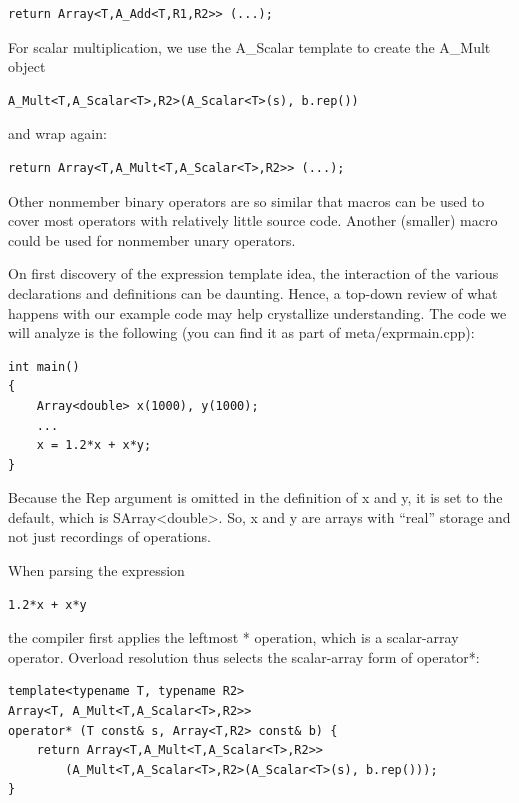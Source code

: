 \begin{lstlisting}[style=styleCXX]
return Array<T,A_Add<T,R1,R2>> (...);
\end{lstlisting}

For scalar multiplication, we use the A\_Scalar template to create the A\_Mult object

\begin{lstlisting}[style=styleCXX]
A_Mult<T,A_Scalar<T>,R2>(A_Scalar<T>(s), b.rep())
\end{lstlisting}

and wrap again:

\begin{lstlisting}[style=styleCXX]
return Array<T,A_Mult<T,A_Scalar<T>,R2>> (...);
\end{lstlisting}

Other nonmember binary operators are so similar that macros can be used to cover most operators with relatively little source code. Another (smaller) macro could be used for nonmember unary operators.


On first discovery of the expression template idea, the interaction of the various declarations and definitions can be daunting. Hence, a top-down review of what happens with our example code may help crystallize understanding. The code we will analyze is the following (you can find it as part of meta/exprmain.cpp):

\begin{lstlisting}[style=styleCXX]
int main()
{
	Array<double> x(1000), y(1000);
	...
	x = 1.2*x + x*y;
}
\end{lstlisting}

Because the Rep argument is omitted in the definition of x and y, it is set to the default, which is SArray<double>. So, x and y are arrays with “real” storage and not just recordings of operations.

When parsing the expression

\begin{lstlisting}[style=styleCXX]
1.2*x + x*y
\end{lstlisting}

the compiler first applies the leftmost * operation, which is a scalar-array operator. Overload resolution thus selects the scalar-array form of operator*:

\begin{lstlisting}[style=styleCXX]
template<typename T, typename R2>
Array<T, A_Mult<T,A_Scalar<T>,R2>>
operator* (T const& s, Array<T,R2> const& b) {
	return Array<T,A_Mult<T,A_Scalar<T>,R2>>
		(A_Mult<T,A_Scalar<T>,R2>(A_Scalar<T>(s), b.rep()));
}
\end{lstlisting}

